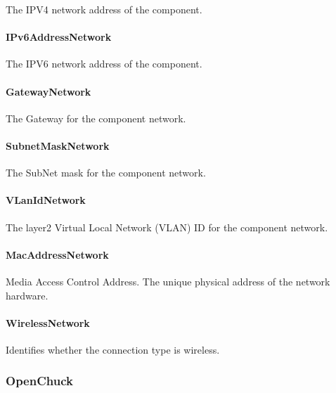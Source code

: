 The IPV4 network address of the component.



\paragraph{IPv6AddressNetwork}\mbox{}
\label{sec:IPv6AddressNetwork}


The IPV6 network address of the component.



\paragraph{GatewayNetwork}\mbox{}
\label{sec:GatewayNetwork}


The Gateway for the component network.


\paragraph{SubnetMaskNetwork}\mbox{}
\label{sec:SubnetMaskNetwork}


The SubNet mask for the component network.



\paragraph{VLanIdNetwork}\mbox{}
\label{sec:VLanIdNetwork}


The layer2 Virtual Local Network (VLAN) ID for the component network.


\paragraph{MacAddressNetwork}\mbox{}
\label{sec:MacAddressNetwork}


Media Access Control Address. The unique physical address of the network hardware.



\paragraph{WirelessNetwork}\mbox{}
\label{sec:WirelessNetwork}


Identifies whether the connection type is wireless.


\subsubsection{OpenChuck}
\label{sec:OpenChuck}



